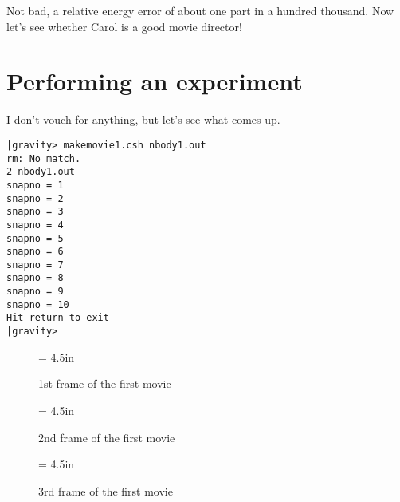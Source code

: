 \abc

\bob
Not bad, a relative energy error of about one part in a hundred
thousand.  Now let's see whether Carol is a good movie director!

\cba

\section{Performing an experiment}

\abc

\carol
I don't vouch for anything, but let's see what comes up.

\cba

\begin{small}
\begin{verbatim}
|gravity> makemovie1.csh nbody1.out
rm: No match.
2 nbody1.out
snapno = 1
snapno = 2
snapno = 3
snapno = 4
snapno = 5
snapno = 6
snapno = 7
snapno = 8
snapno = 9
snapno = 10
Hit return to exit
|gravity>
\end{verbatim}
\end{small}


\begin{figure}[htb]
\begin{center}
\epsfxsize = 4.5in
\caption[1st frame of movie \#1]
{1st frame of the first movie}
\label{fig:movie1.1}
\end{center}
\end{figure}

\begin{figure}[htb]
\begin{center}
\epsfxsize = 4.5in
\caption[2nd frame of movie \#1]
{2nd frame of the first movie}
\label{fig:movie1.2}
\end{center}
\end{figure}

\begin{figure}[htb]
\begin{center}
\epsfxsize = 4.5in
\caption[3rd frame of movie \#1]
{3rd frame of the first movie}
\label{fig:movie1.3}
\end{center}
\end{figure}

